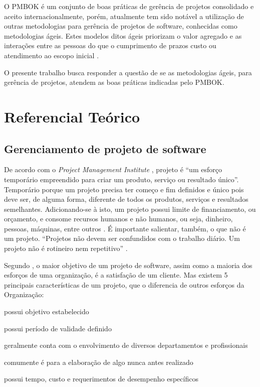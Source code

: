 \documentclass[
    12pt,               %
    openright,          %
    twoside,            %
    a4paper,            %
    chapter=TITLE,     %
    english,            %
    spanish,            %
    portuguese              %
    ]{abntex2}
\newcommand\dblquote[1]{\textquotedblleft #1\textquotedblright}
\begin{document}
O PMBOK é um conjunto de boas práticas de gerência de projetos consolidado e aceito internacionalmente, porém, atualmente tem sido notável a utilização de outras metodologias para gerência de projetos de software, conhecidas como metodologias ágeis. Estes modelos ditos ágeis priorizam o valor agregado e as interações entre as pessoas do que o cumprimento de prazos custo ou atendimento ao escopo inicial \cite[p.~xxi]{prikladnickiAtAll}.


O presente trabalho busca responder a questão de se as metodologias ágeis, para gerência de projetos, atendem as boas práticas indicadas pelo PMBOK.



\chapter{Referencial Teórico}

\section{Gerenciamento de projeto de software}

De acordo com o \textit{Project Management Institute} \cite{pmi2013}, projeto é \dblquote{um esforço temporário empreendido para criar um produto, serviço ou resultado único}. Temporário porque um projeto precisa ter começo e fim definidos e único pois deve ser, de alguma forma, diferente de todos os produtos, serviços e resultados semelhantes. Adicionando-se à isto, um projeto possui limite de financiamento, ou orçamento, e consome recursos humanos e não humanos, ou seja, dinheiro, pessoas, máquinas, entre outros \cite[p.~2]{kerzner2011}. É importante salientar, também, o que não é um projeto. \dblquote{Projetos não devem ser confundidos com o trabalho diário. Um projeto não é rotineiro nem repetitivo} \cite[p.~6]{grayLarson2009}.


Segundo , o maior objetivo de um projeto de software, assim como a maioria dos esforços de uma organização, é a satisfação de um cliente. Mas existem 5 principais características de um projeto, que o diferencia de outros esforços da Organização: 

\begin{alineas}
	\item possui objetivo estabelecido
	\item possui período de validade definido
	\item geralmente conta com o envolvimento de diversos departamentos e profissionais
	\item comumente é para a elaboração de algo nunca antes realizado
	\item possui tempo, custo e requerimentos de desempenho específicos
\end{alineas}
\end{document}
